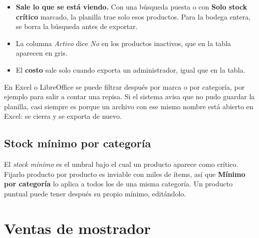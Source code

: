 \documentclass[11pt,a4paper]{article}
\begin{document}
\begin{itemize}
  \item \textbf{Sale lo que se está viendo.} Con una búsqueda puesta o con
        \textbf{Solo stock crítico} marcado, la planilla trae solo esos
        productos. Para la bodega entera, se borra la búsqueda antes de
        exportar.
  \item La columna \emph{Activo} dice \emph{No} en los productos inactivos, que
        en la tabla aparecen en gris.
  \item El \textbf{costo} sale solo cuando exporta un administrador, igual que
        en la tabla.
\end{itemize}

En Excel o LibreOffice se puede filtrar después por marca o por categoría, por
ejemplo para salir a contar una repisa. Si el sistema avisa que no pudo guardar
la planilla, casi siempre es porque un archivo con ese mismo nombre está
abierto en Excel: se cierra y se exporta de nuevo.

\subsection{Stock mínimo por categoría}
\label{sec:minimos}


El \emph{stock mínimo} es el umbral bajo el cual un producto aparece como
crítico. Fijarlo producto por producto es inviable con miles de ítems, así que
\textbf{Mínimo por categoría} lo aplica a todos los de una misma categoría. Un
producto puntual puede tener después su propio mínimo, editándolo.

\section{Ventas de mostrador}

\end{document}
